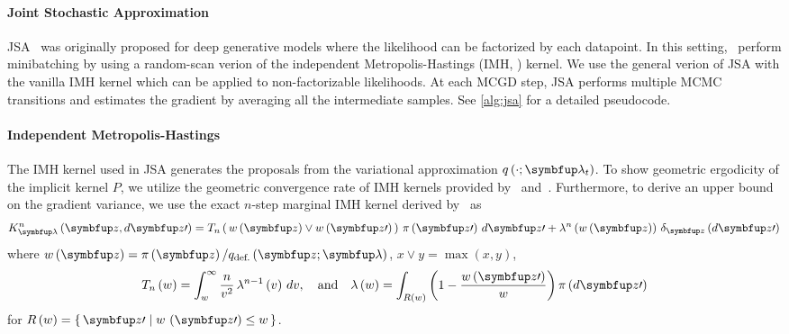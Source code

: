 \paragraph{Joint Stochastic Approximation}
JSA~\citep{pmlr-v124-ou20a} was originally proposed for deep generative models where the likelihood can be factorized by each datapoint.
In this setting,~\citeauthor{pmlr-v124-ou20a} perform minibatching by using a random-scan verion of the independent Metropolis-Hastings (IMH, \citealt{hastings_monte_1970,robert_monte_2004}) kernel.
We use the general verion of JSA with the vanilla IMH kernel which can be applied to non-factorizable likelihoods.
At each MCGD step, JSA performs multiple MCMC transitions and estimates the gradient by averaging all the intermediate samples.
See \cref{alg:jsa} for a detailed pseudocode.

\vspace{-0.1in}
\paragraph{Independent Metropolis-Hastings}
The IMH kernel used in JSA generates the proposals from the variational approximation \(q\left(\cdot; \vlambda_t\right)\).
To show geometric ergodicity of the implicit kernel \(P\), we utilize the geometric convergence rate of IMH kernels provided by~\citet[Theorem 2.1]{10.2307/2242610} and~\citet{wang_exact_2020}.
Furthermore, to derive an upper bound on the gradient variance, we use the exact \(n\)-step marginal IMH kernel derived by~\citet{Smith96exacttransition} as
{%
  \begin{align}
  K^n_{\vlambda}\left(\vz, d\vz\prime\right) 
  = T_n\left(\, w\left(\vz\right) \vee w\left(\vz\prime\right)\,\right) \, \pi\left(\vz\prime\right) \, d\vz\prime
  + \lambda^n\left(w\left(\vz\right)\right) \, \delta_{\vz}\left(d\vz\prime\right)
  \label{eq:imh_exact_kernel}
  \end{align}
}%
where {\(w\left(\vz\right) = \pi\left(\vz\right)/q_{\text{def.}}\left(\vz; \vlambda\right)\), \(x \vee y = \max\left(x, y\right)\)},
{\small
  \begin{align}
    T_n\left(w\right)      = \int_w^{\infty}
    \frac{n}{v^2}
    \, \lambda^{n-1}\left(v\right)\,dv,
    \quad\text{and}\quad
    \lambda\left(w\right) =
    \int_{R\left(w\right)}
    \left( 1 - \frac{w\left(\vz\prime\right)}{w}  \right)
    \pi\left(d\vz\prime\right)\label{eq:T_lambda}
  \end{align}
}
for {\(R\left(w\right) = \{\, \vz\prime \mid w\,\left(\vz\prime\right) \leq w \,\}\)}.
%


%


